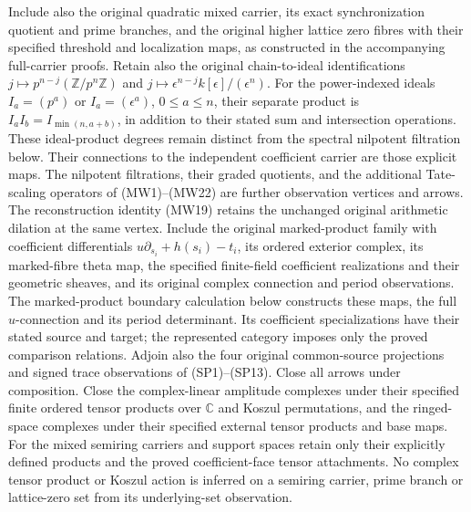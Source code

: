 Include also the original quadratic mixed carrier, its exact
synchronization quotient and prime branches, and the original
higher lattice zero fibres with their specified threshold and
localization maps, as constructed in the accompanying full-carrier
proofs. Retain also the original chain-to-ideal identifications
$j\mapsto p^{n-j}(\mathbb Z/p^n\mathbb Z)$ and
$j\mapsto\epsilon^{n-j}k[\epsilon]/(\epsilon^n)$.
For the power-indexed ideals $I_a=(p^a)$ or $I_a=(\epsilon^a)$,
$0\leq a\leq n$, their separate product is
$I_aI_b=I_{\min(n,a+b)}$, in addition to their stated sum and
intersection operations. These ideal-product degrees remain
distinct from the spectral nilpotent filtration below.
Their connections to the independent coefficient carrier
are those explicit maps. The nilpotent filtrations, their graded
quotients, and the additional Tate-scaling operators of
(MW1)--(MW22) are further observation vertices and arrows.
The reconstruction identity (MW19) retains the unchanged original
arithmetic dilation at the same vertex.
Include the original marked-product family with coefficient
differentials $u\partial_{s_i}+h(s_i)-t_i$, its ordered exterior
complex, its marked-fibre theta map, the specified finite-field
coefficient realizations and their geometric sheaves, and its
original complex connection and period observations. The
marked-product boundary calculation below constructs these maps,
the full $u$-connection and its period determinant. Its
coefficient specializations have their stated source and target;
the represented category imposes only the proved comparison
relations. Adjoin also the four original common-source
projections and signed trace observations of (SP1)--(SP13).
Close all arrows under composition. Close the complex-linear amplitude
complexes under their specified finite ordered tensor products over
$\mathbb C$ and Koszul permutations, and the ringed-space complexes
under their specified external tensor products and base maps.
For the mixed semiring carriers and support spaces retain only their
explicitly defined products and the proved coefficient-face tensor
attachments. No complex tensor product or Koszul action is inferred
on a semiring carrier, prime branch or lattice-zero set from its
underlying-set observation.

